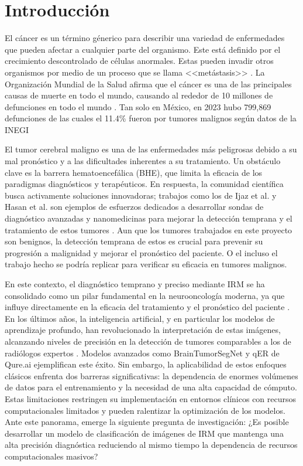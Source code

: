 \section{Introducción}

El cáncer es un término génerico para describir una variedad de enfermedades que pueden afectar a cualquier parte del organismo. Este está definido por el crecimiento descontrolado de células anormales. Estas pueden invadir otros organismos por medio de un proceso que se llama <<metástasis>> \cite{cancer_gov_que_es}. La Organización Mundial de la Salud afirma que el cáncer es una de las principales causas de muerte en todo el mundo, causando al rededor de 10 millones de defunciones en todo el mundo \cite{who_cancer_2022}. Tan solo en México, en 2023 hubo 799,869 defunciones de las cuales el 11.4\% fueron por tumores malignos según datos de la INEGI \cite{INEGI2025}

El tumor cerebral maligno es una de las enfermedades más peligrosas debido a su mal pronóstico y a las dificultades inherentes a su tratamiento. Un obstáculo clave es la barrera hematoencefálica (BHE), que limita la eficacia de los paradigmas diagnósticos y terapéuticos. En respuesta, la comunidad científica busca activamente soluciones innovadoras; trabajos como los de Ijaz et al. y Hasan et al. son ejemplos de esfuerzos dedicados a desarrollar sondas de diagnóstico avanzadas y nanomedicinas para mejorar la detección temprana y el tratamiento de estos tumores \cite{ijaz_diagnostics_2025, hasan_recent_2023}. Aun que los tumores trabajados en este proyecto son benignos, la detección temprana de estos es crucial para prevenir su progresión a malignidad y mejorar el pronóstico del paciente. O el incluso el trabajo hecho se podría replicar para verificar su eficacia en tumores malignos.


En este contexto, el diagnóstico temprano y preciso mediante IRM se ha consolidado como un pilar fundamental en la neurooncología moderna, ya que influye directamente en la eficacia del tratamiento y el pronóstico del paciente \cite{Akkus2017deep}. En los últimos años, la inteligencia artificial, y en particular los modelos de aprendizaje profundo, han revolucionado la interpretación de estas imágenes, alcanzando niveles de precisión en la detección de tumores comparables a los de radiólogos expertos \cite{pereira2016brain, liew2018artificial}. Modelos avanzados como BrainTumorSegNet \cite{XiaojunHu2020} y qER de Qure.ai \cite{Qure.ai2024} ejemplifican este éxito. Sin embargo, la aplicabilidad de estos enfoques clásicos enfrenta dos barreras significativas: la dependencia de enormes volúmenes de datos para el entrenamiento y la necesidad de una alta capacidad de cómputo. Estas limitaciones restringen su implementación en entornos clínicos con recursos computacionales limitados y pueden ralentizar la optimización de los modelos. Ante este panorama, emerge la siguiente pregunta de investigación: ¿Es posible desarrollar un modelo de clasificación de imágenes de IRM que mantenga una alta precisión diagnóstica reduciendo al mismo tiempo la dependencia de recursos computacionales masivos?

